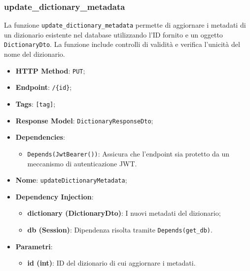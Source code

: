 \subsubsection{update\_dictionary\_metadata}

\par La funzione \texttt{update\_dictionary\_metadata} permette di aggiornare i metadati di un dizionario esistente nel database utilizzando l'ID fornito e un oggetto \texttt{DictionaryDto}. La funzione include controlli di validità e verifica l'unicità del nome del dizionario.

\begin{itemize}
\item \textbf{HTTP Method}: \texttt{PUT};
\item \textbf{Endpoint}: \texttt{/\{id\}};
\item \textbf{Tags}: \texttt{[tag]};
\item \textbf{Response Model}: \texttt{DictionaryResponseDto};
\item \textbf{Dependencies}:
\begin{itemize}
\item \texttt{Depends(JwtBearer())}: Assicura che l'endpoint sia protetto da un meccanismo di autenticazione JWT.
\end{itemize}
\item \textbf{Nome}: \texttt{updateDictionaryMetadata};
\item \textbf{Dependency Injection}:
\begin{itemize}
\item \textbf{dictionary (DictionaryDto)}: I nuovi metadati del dizionario;
\item \textbf{db (Session)}: Dipendenza risolta tramite \texttt{Depends(get\_db)}.
\end{itemize}
\item \textbf{Parametri}:
\begin{itemize}
\item \textbf{id (int)}: ID del dizionario di cui aggiornare i metadati.
\end{itemize}
\end{itemize}

